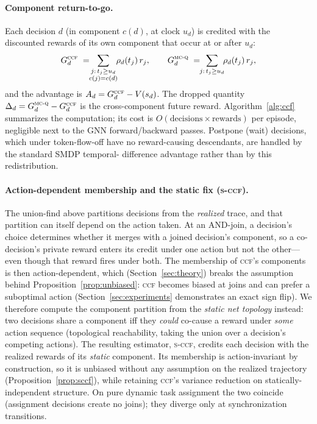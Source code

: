 \documentclass[review,authoryear,3p,times]{elsarticle}
\newcommand{\ccf}{\textsc{ccf}}
\newcommand{\sccf}{\textsc{s-ccf}}
\newcommand{\mcq}{\textsc{mc-q}}
\begin{document}
\paragraph{Component return-to-go.} Each decision $d$ (in component $c(d)$, at
clock $u_d$) is credited with the discounted rewards of its own component that
occur at or after $u_d$:
\begin{equation}
G_d^{\ccf} \;=\!\! \sum_{\substack{j:\,t_j\ge u_d\\ c(j)=c(d)}}\!\! \rho_d(t_j)\,r_j,
\qquad
G_d^{\mcq} \;=\!\! \sum_{j:\,t_j\ge u_d}\!\! \rho_d(t_j)\,r_j,
\end{equation}
and the advantage is $A_d = G_d^{\ccf}-V(s_d)$. The dropped quantity
$\Delta_d = G_d^{\mcq}-G_d^{\ccf}$ is the cross-component future reward.
Algorithm~\ref{alg:ccf} summarizes the computation; its cost is
$O(\text{decisions}\times\text{rewards})$ per episode, negligible next to the GNN
forward/backward passes. Postpone (wait) decisions, which under token-flow-off
have no reward-causing descendants, are handled by the standard SMDP temporal-
difference advantage rather than by this redistribution.

\paragraph{Action-dependent membership and the static fix (\sccf).} The union-find
above partitions decisions from the \emph{realized} trace, and that partition can
itself depend on the action taken. At an AND-join, a decision's choice determines
whether it merges with a joined decision's component, so a co-decision's private
reward enters its credit under one action but not the other---even though that
reward fires under both. The membership of \ccf's components is then
action-dependent, which (Section~\ref{sec:theory}) breaks the assumption behind
Proposition~\ref{prop:unbiased}: \ccf{} becomes biased at joins and can prefer a
suboptimal action (Section~\ref{sec:experiments} demonstrates an exact sign
flip). We therefore compute the component partition from the \emph{static net
topology} instead: two decisions share a component iff they \emph{could}
co-cause a reward under \emph{some} action sequence (topological reachability,
taking the union over a decision's competing actions). The resulting estimator,
\sccf, credits each decision with the realized rewards of its \emph{static}
component. Its membership is action-invariant by construction, so it is
unbiased without any assumption on the realized trajectory
(Proposition~\ref{prop:sccf}), while retaining \ccf's variance reduction on
statically-independent structure. On pure dynamic task assignment the two
coincide (assignment decisions create no joins); they diverge only at
synchronization transitions.
\end{document}
